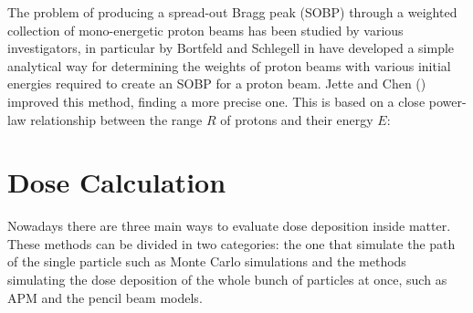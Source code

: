 \documentclass[12pt, a4paper, twoside]{book}
\begin{document}
The problem of producing a spread-out Bragg peak (SOBP) through a weighted collection of mono-energetic proton beams has been studied by various investigators, in particular by Bortfeld and Schlegell in \cite{bort:SOBP} have developed a simple analytical way for determining the weights of proton beams with various initial energies required to create an SOBP for a proton beam. Jette and Chen (\cite{jett:SOBP}) improved this method, finding a more precise one. %
This is based on a close power-law relationship between the range $R$ of protons and their energy $E$:





\section{Dose Calculation}
Nowadays there are three main ways to evaluate dose deposition inside matter. These methods can be divided in two categories: the one that simulate the path of the single particle such as Monte Carlo simulations and the methods simulating the dose deposition of the whole bunch of particles at once, such as APM and the pencil beam models.


\end{document}
